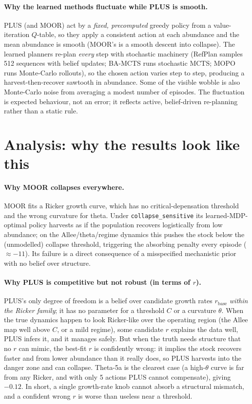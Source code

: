 \documentclass[11pt]{article}
\begin{document}
\paragraph{Why the learned methods fluctuate while PLUS is smooth.} PLUS (and MOOR) act by
a \emph{fixed, precomputed} greedy policy from a value-iteration $Q$-table, so they apply a
consistent action at each abundance and the mean abundance is smooth (MOOR's is a smooth
descent into collapse). The learned planners re-plan \emph{every} step with stochastic
machinery (RefPlan samples 512 sequences with belief updates; BA-MCTS runs stochastic
MCTS; MOPO runs Monte-Carlo rollouts), so the chosen action varies step to step, producing
a harvest-then-recover sawtooth in abundance. Some of the visible wobble is also Monte-Carlo
noise from averaging a modest number of episodes. The fluctuation is expected behaviour,
not an error; it reflects active, belief-driven re-planning rather than a static rule.

\section{Analysis: why the results look like this}
\label{sec:analysis}

\paragraph{Why MOOR collapses everywhere.} MOOR fits a Ricker growth curve, which has no
critical-depensation threshold and the wrong curvature for theta. Under
\texttt{collapse\_sensitive} its learned-MDP-optimal policy harvests as if the population
recovers logistically from low abundance; on the Allee/theta/regime dynamics this pushes
the stock below the (unmodelled) collapse threshold, triggering the absorbing penalty
every episode ($\approx -11$). Its failure is a direct consequence of a misspecified
mechanistic prior with no belief over structure.

\paragraph{Why PLUS is competitive but not robust (in terms of $r$).} PLUS's only degree
of freedom is a belief over candidate growth rates $r_{\text{base}}$ \emph{within the
Ricker family}; it has no parameter for a threshold $C$ or a curvature $\theta$. When the
true dynamics happen to look Ricker-like over the operating region (the Allee map well
above $C$, or a mild regime), some candidate $r$ explains the data well, PLUS infers it,
and it manages safely. But when the truth needs structure that no $r$ can mimic, the
best-fit $r$ is confidently wrong: it implies the stock recovers faster and from lower
abundance than it really does, so PLUS harvests into the danger zone and can collapse.
Theta-5a is the clearest case (a high-$\theta$ curve is far from any Ricker, and with only
5 actions PLUS cannot compensate), giving $-0.12$. In short, a single growth-rate knob
cannot absorb a structural mismatch, and a confident wrong $r$ is worse than useless near
a threshold.
\end{document}
